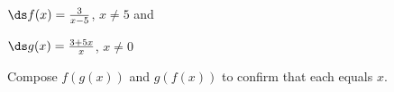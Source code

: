 {$\ds f(x) = \frac{3}{x-5}$, $x\neq 5$ and 

$\ds g(x) = \frac{3+5x}{x}$, $x\neq 0$}
{Compose $f(g(x))$ and $g(f(x))$ to confirm that each equals $x$.
}
